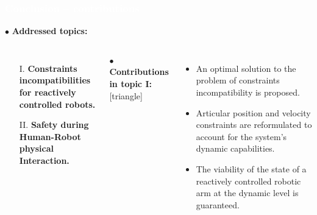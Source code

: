 \begin{frame}[noframenumbering]
\frametitle{{\textcolor{white}{\hspace{0.3cm}Conclusion -- contributions}}}


\hspace{-6mm}
$\bullet$ {\color{blue-violet}\textbf{Addressed topics:}}
\begin{columns}
\column{\paperwidth-10mm}
\begin{itemize}
\item[I.]  {\color{red}\textbf{Constraints incompatibilities for reactively controlled robots.}}
\item[II.] {\color{red}\textbf{Safety during Human-Robot physical Interaction.}}
\end{itemize}
\vspace{5mm}

$\bullet$ {\color{ao(english)}\textbf{Contributions in topic I:}}
[triangle] 
\begin{itemize}
\item An optimal solution to the problem of constraints incompatibility is proposed.

\item Articular position and velocity constraints are reformulated to account for the system's dynamic capabilities.

\item The viability of the state of a reactively controlled robotic arm at the dynamic level is guaranteed.

\end{itemize}
\end{columns}
\end{frame}


